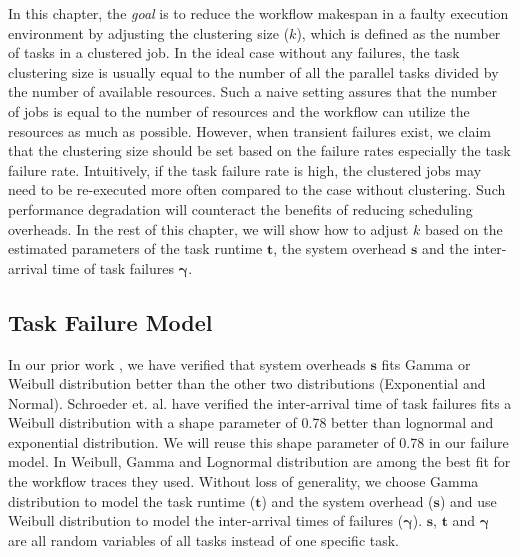 In this chapter, the \emph{goal} is to reduce the workflow makespan in a faulty execution environment by adjusting the clustering size ($k$), which is defined as the number of tasks in a clustered job. In the ideal case without any failures, the task clustering size is usually equal to the number of all the parallel tasks divided by the number of available resources. Such a naive setting assures that the number of jobs is equal to the number of resources and the workflow can utilize the resources as much as possible. However, when transient failures exist, we claim that the clustering size should be set based on the failure rates especially the task failure rate. Intuitively, if the task failure rate is high, the clustered jobs may need to be re-executed more often compared to the case without clustering. Such performance degradation will counteract the benefits of reducing scheduling overheads. In the rest of this chapter, we will show how to adjust $k$ based on the estimated parameters of the task runtime $\bm t$, the system overhead $\bm s$ and the inter-arrival time of task failures $\bm\gamma$. 

\subsection{Task Failure Model}




In our prior work \cite{Chen2011}, we have verified that system overheads $\bm s$ fits Gamma or Weibull distribution better than the other two distributions (Exponential and Normal). Schroeder et. al. \cite{Schroeder2006} have verified the inter-arrival time of task failures fits a Weibull distribution with a shape parameter of 0.78 better than lognormal and exponential distribution. We will reuse this shape parameter of 0.78 in our failure model. 
In \cite{Sun2003, Iosup2008} Weibull, Gamma and Lognormal distribution are among the best fit for the workflow traces they used.  Without loss of generality, we choose Gamma distribution to model the task runtime ($\bm t$) and the system overhead ($\bm s$) and use Weibull distribution to model the inter-arrival times of failures ($\bm\gamma$).  $\bm s$, $\bm t$ and $\bm \gamma$ are all random variables of all tasks instead of one specific task. 

